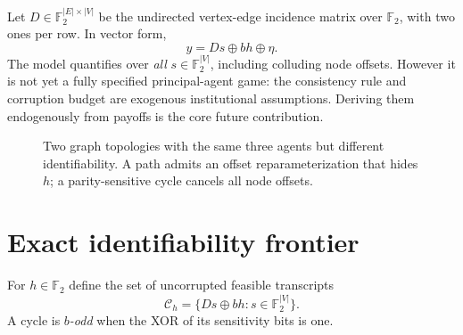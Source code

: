 \documentclass[10pt,a4paper]{article}
\theoremstyle{definition}\newtheorem{definition}[theorem]{Definition}
\newcommand{\F}{\mathbb F_2}
\begin{document}
Let $D\in\F^{|E|\times|V|}$ be the undirected vertex-edge incidence matrix over $\F$, with two ones per row. In vector form,
\begin{equation}\label{eq:matrix}
 y=Ds\oplus bh\oplus\eta.
\end{equation}
The model quantifies over \emph{all} $s\in\F^{|V|}$, including colluding node offsets. However it is not yet a fully specified principal-agent game: the consistency rule and corruption budget are exogenous institutional assumptions. Deriving them endogenously from payoffs is the core future contribution.

\begin{figure}[t]
\centering
{}
\caption{Two graph topologies with the same three agents but different identifiability. A path admits an offset reparameterization that hides $h$; a parity-sensitive cycle cancels all node offsets.}
\end{figure}

\section{Exact identifiability frontier}
For $h\in\F$ define the set of uncorrupted feasible transcripts
\begin{equation}\label{eq:cosets}
 \mathcal C_h=\{Ds\oplus bh:s\in\F^{|V|}\}.
\end{equation}
A cycle is \emph{$b$-odd} when the XOR of its sensitivity bits is one.
\end{document}
